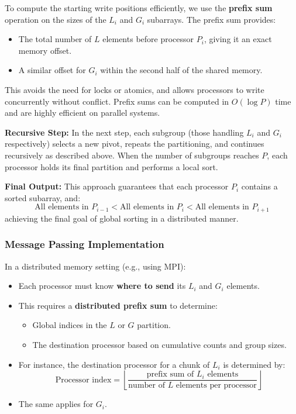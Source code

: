 \documentclass[12pt]{book}
\begin{document}
To compute the starting write positions efficiently, we use the \textbf{prefix sum} operation on the sizes of the $L_i$ and $G_i$ subarrays. The prefix sum provides:
\begin{itemize}
    \item The total number of $L$ elements before processor $P_i$, giving it an exact memory offset.
    \item A similar offset for $G_i$ within the second half of the shared memory.
\end{itemize}

This avoids the need for locks or atomics, and allows processors to write concurrently without conflict. Prefix sums can be computed in $O(\log P)$ time and are highly efficient on parallel systems.

\textbf{Recursive Step:}  
In the next step, each subgroup (those handling $L_i$ and $G_i$ respectively) selects a new pivot, repeats the partitioning, and continues recursively as described above. When the number of subgroups reaches $P$, each processor holds its final partition and performs a local sort.

\textbf{Final Output:}  
This approach guarantees that each processor $P_i$ contains a sorted subarray, and:
\[
\text{All elements in } P_{i-1} <\text{All elements in } P_i < \text{All elements in } P_{i+1}
\]
achieving the final goal of global sorting in a distributed manner.

\subsubsection{Message Passing Implementation}

In a distributed memory setting (e.g., using MPI):

\begin{itemize}
    \item Each processor must know \textbf{where to send} its $L_i$ and $G_i$ elements.
    \item This requires a \textbf{distributed prefix sum} to determine:
    \begin{itemize}
        \item Global indices in the $L$ or $G$ partition.
        \item The destination processor based on cumulative counts and group sizes.
    \end{itemize}
    
    \item For instance, the destination processor for a chunk of $L_i$ is determined by:
    \[
    \text{Processor index} = \left\lfloor \frac{\text{prefix sum of $L_i$ elements}}{\text{number of $L$ elements per processor}} \right\rfloor
    \]
    
    \item The same applies for $G_i$.
\end{itemize}
\end{document}
